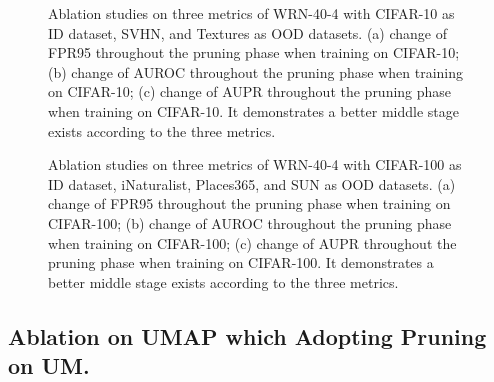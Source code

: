 \documentclass{article}
\theoremstyle{plain}
\theoremstyle{definition}
\theoremstyle{remark}
\begin{document}
\begin{figure}[t!]
    \begin{center}
    \end{center}
    \caption{Ablation studies on three metrics of WRN-40-4 with CIFAR-10 as ID dataset, SVHN, and Textures as OOD datasets. (a) change of FPR95 throughout the pruning phase when training on CIFAR-10; (b) change of AUROC throughout the pruning phase when training on CIFAR-10; (c) change of AUPR throughout the pruning phase when training on CIFAR-10. It demonstrates a better middle stage exists according to the three metrics.}
    \label{fig9:abla_app_3}
\end{figure}

\begin{figure}[t!]
    \begin{center}
    \end{center}
    \caption{Ablation studies on three metrics of WRN-40-4 with CIFAR-100 as ID dataset, iNaturalist, Places365, and SUN as OOD datasets. (a) change of FPR95 throughout the pruning phase when training on CIFAR-100; (b) change of AUROC throughout the pruning phase when training on CIFAR-100; (c) change of AUPR throughout the pruning phase when training on CIFAR-100. It demonstrates a better middle stage exists according to the three metrics.}
    \label{fig10:abla_app_4}
\end{figure}

\subsection{Ablation on UMAP which Adopting Pruning on UM.} 
\label{app:abl_UMAP}
\end{document}
